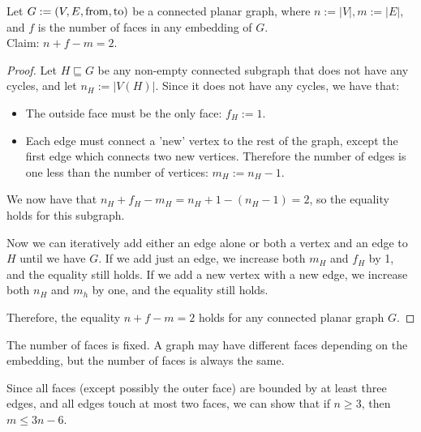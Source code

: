 \begin{theorem}
    Let $G := (V, E, \operatorname{from}, \operatorname{to})$ be a connected planar graph, where $n := |V|, m := |E|$, and $f$ is the number of faces in any embedding of $G$. \\
    Claim: $n + f - m = 2$.

    \begin{proof}
        Let $H \sqsubseteq G$ be any non-empty connected subgraph that does not have any cycles, and let $n_H := |V(H)|$. Since it does not have any cycles, we have that:
        \begin{itemize}
            \item The outside face must be the only face: $f_H := 1$.
            \item Each edge must connect a 'new' vertex to the rest of the graph, except the first edge which connects two new vertices. Therefore the number of edges is one less than the number of vertices: $m_H := n_H - 1$.
        \end{itemize}
        We now have that $n_H + f_H - m_H = n_H + 1 - (n_H-1) = 2$, so the equality holds for this subgraph.

        Now we can iteratively add either an edge alone or both a vertex and an edge to $H$ until we have $G$. If we add just an edge, we increase both $m_H$ and $f_H$ by 1, and the equality still holds. If we add a new vertex with a new edge, we increase both $n_H$ and $m_h$ by one, and the equality still holds. 
        
        Therefore, the equality $n + f - m = 2$ holds for any connected planar graph $G$.
    \end{proof}
\end{theorem}

\begin{corollary}
    The number of faces is fixed. A graph may have different faces depending on the embedding, but the number of faces is always the same.
\end{corollary}
    
\begin{corollary}
    \label{corollary:m-leq-3n}
    Since all faces (except possibly the outer face) are bounded by at least three edges, and all edges touch at most two faces, we can show that if $n \geq 3$, then $m \leq 3n-6$.
\end{corollary}
